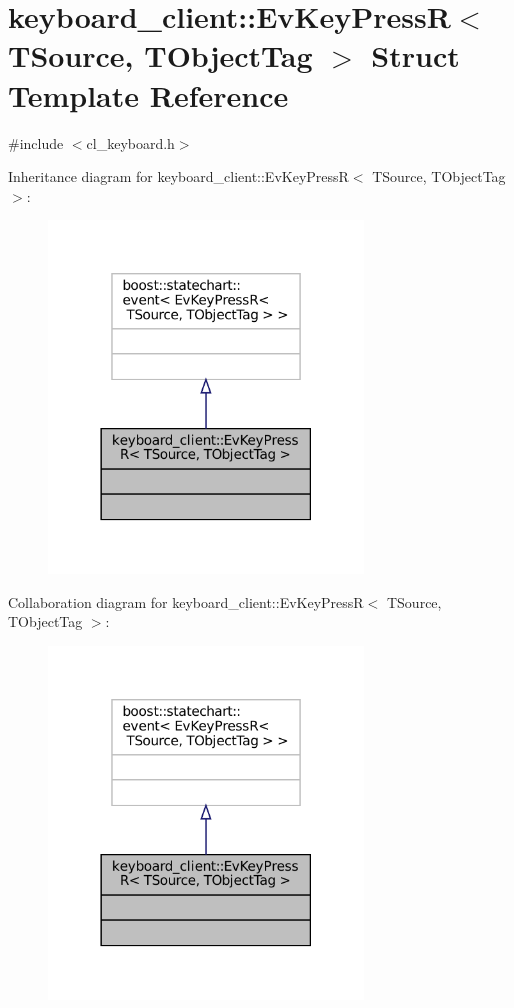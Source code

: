 \hypertarget{structkeyboard__client_1_1EvKeyPressR}{}\section{keyboard\+\_\+client\+:\+:Ev\+Key\+PressR$<$ T\+Source, T\+Object\+Tag $>$ Struct Template Reference}
\label{structkeyboard__client_1_1EvKeyPressR}


{\ttfamily \#include $<$cl\+\_\+keyboard.\+h$>$}



Inheritance diagram for keyboard\+\_\+client\+:\+:Ev\+Key\+PressR$<$ T\+Source, T\+Object\+Tag $>$\+:
\nopagebreak
\begin{figure}[H]
\begin{center}
\leavevmode
\includegraphics[width=237pt]{structkeyboard__client_1_1EvKeyPressR__inherit__graph}
\end{center}
\end{figure}


Collaboration diagram for keyboard\+\_\+client\+:\+:Ev\+Key\+PressR$<$ T\+Source, T\+Object\+Tag $>$\+:
\nopagebreak
\begin{figure}[H]
\begin{center}
\leavevmode
\includegraphics[width=237pt]{structkeyboard__client_1_1EvKeyPressR__coll__graph}
\end{center}
\end{figure}



